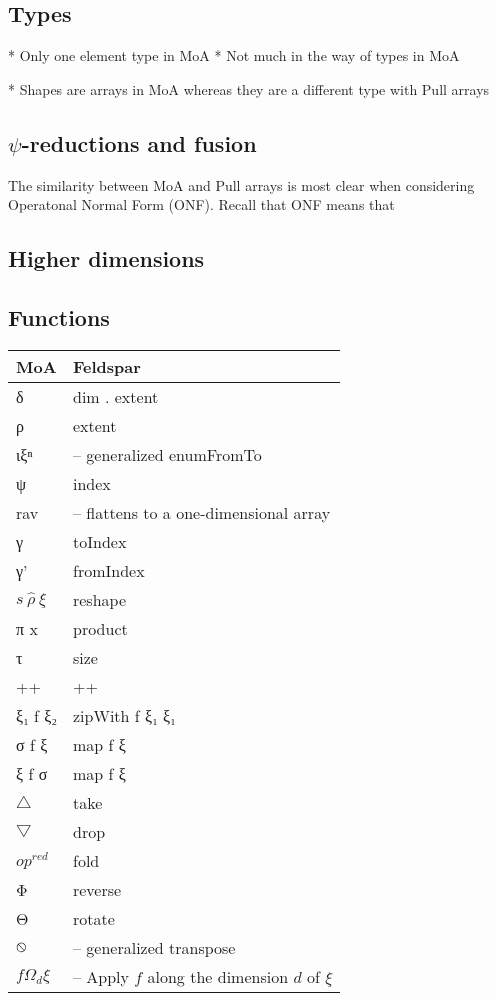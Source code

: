 \documentclass{sigplanconf}
\begin{document}
\subsection{Types}
\label{sec:types}

* Only one element type in MoA
* Not much in the way of types in MoA

* Shapes are arrays in MoA whereas they are a different type with Pull arrays

\subsection{\(\psi\)-reductions and fusion}
\label{sec:normalization}

The similarity between MoA and Pull arrays is most clear when
considering Operatonal Normal Form (ONF). Recall that ONF means that 


\subsection{Higher dimensions}
\label{sec:highdim}

\subsection{Functions}
\label{sec:notation}

\begin{tabular}{|@{}l|l@{}|}
\hline
MoA & Feldspar
\\
\hline
δ & dim . extent
\\
ρ & extent
\\
ιξⁿ & -- generalized enumFromTo
\\
ψ & index
\\
rav & -- flattens to a one-dimensional array
\\
γ & toIndex
\\
γ' & fromIndex
\\
$s \: \hat{ρ} \: ξ$ & reshape
\\
π x & product
\\
τ & size
\\
++ & ++
\\
ξ₁ f ξ₂ & zipWith f ξ₁ ξ₁
\\
σ f ξ & map f ξ
\\
ξ f σ & map f ξ
\\
$\bigtriangleup$ & take
\\
$\bigtriangledown$ & drop
\\
$op^{red}$ & fold
\\
Φ & reverse
\\
Θ & rotate
\\
$\varobslash$ & -- generalized transpose
\\
$f Ω_d ξ$ & -- Apply $f$ along the dimension $d$ of $ξ$
\\
\hline
\end{tabular}
\end{document}
